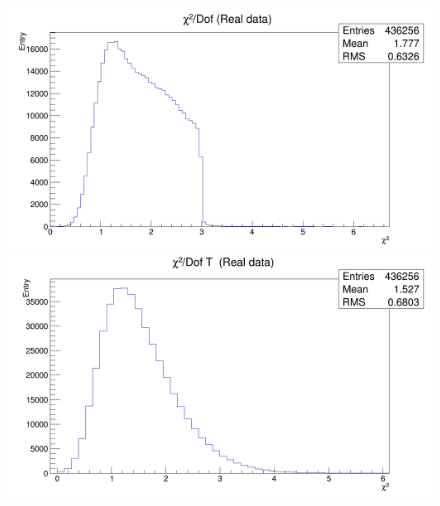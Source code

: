 \begin{figure}[h]    
\begin{minipage}[t]{0.45\textwidth}
\includegraphics[width=\linewidth]{rozdzial6/KsLL_chi2_data.png}
\end{minipage}
\hspace{\fill}
\begin{minipage}[t]{0.45\textwidth}
\includegraphics[width=\linewidth]{rozdzial6/KsLL_chi2T_data.png}
\end{minipage}


\end{figure}
